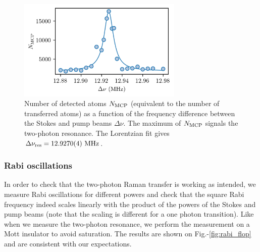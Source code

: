 \begin{figure}
    \centering
    \includegraphics[width=0.7\textwidth]{Fig/Chapter3/raman_res.png}
    \caption[Two-photon Raman transfer resonance]{Number of detected atoms $N_{\rm{MCP}}$ (equivalent to the number of transferred atoms) as a function of the frequency difference between the Stokes and pump beams $\Delta \nu$. The maximum of $N_{\rm{MCP}}$ signals the two-photon resonance. The Lorentzian fit gives $\Delta \nu_{\rm{res}} = 12.9270(4) \ \rm{MHz}$.}
    \label{fig:raman_resonance}
\end{figure}

\subsubsection{Rabi oscillations}

In order to check that the two-photon Raman transfer is working as intended, we measure Rabi oscillations for different powers and check that the square Rabi frequency indeed scales linearly with the product of the powers of the Stokes and pump beams (note that the scaling is different for a one photon transition). Like when we measure the two-photon resonance, we perform the measurement on a Mott insulator to avoid saturation. The results are shown on Fig.-\ref{fig:rabi_flop} and are consistent with our expectations.

